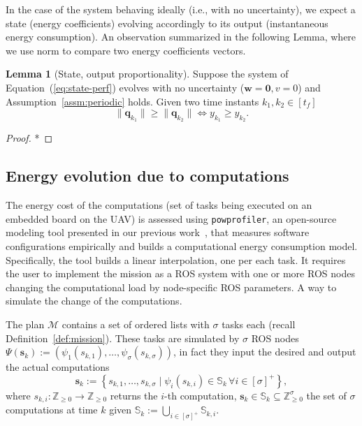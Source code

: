 \documentclass[letterpaper,10pt,conference]{ieeeconf}
\newcommand{\stt}[1]{{\small\tt #1}} %
\newcommand{\powprof}{\stt{powprofiler}}
\theoremstyle{definition}
\newtheorem{lem}[thm]{Lemma}
\begin{document}
In the case of the system behaving ideally (i.e., with no uncertainty), we expect a state (energy coefficients) evolving accordingly to its output (instantaneous energy consumption). An observation summarized in the following Lemma, where we use norm to compare two energy coefficients vectors.

\begin{lem}[State, output proportionality]\label{lem:state-vs-energy}
  Suppose the system of Equation~(\ref{eq:state-perf}) evolves with no uncertainty ($\mathbf{w}=\mathbf{0},v=0$) and Assumption~\ref{assm:periodic} holds. Given two time instants $k_1,k_2\in[t_f]$
  \begin{equation}
    \|\mathbf{q}_{k_1}\|\geq\|\mathbf{q}_{k_2}\|\iff y_{k_1}\geq y_{k_2}.
  \end{equation}
\end{lem}
\begin{proof}
  *
\end{proof}

\subsection{Energy evolution due to computations}
\label{sec:computations-model}

The energy cost of the computations (set of tasks being executed on an embedded board on the UAV) is assessed using \powprof{}, an open-source modeling tool presented in our previous work~\cite{seewald2019coarse}, that measures software configurations empirically and builds a computational energy consumption model. Specifically, the tool builds a linear interpolation, one per each task. It requires the user to implement the mission as a ROS system with one or more ROS nodes changing the computational load by node-specific ROS parameters. A way to simulate the change of the computations.

The plan $\mathcal{M}$ contains a set of ordered lists with $\sigma$ tasks each (recall Definition~\ref{def:mission}). These tasks are simulated by $\sigma$ ROS nodes $\Psi(\mathbf{s}_k):=\left(\psi_1(s_{k,1}),\dots,\psi_\sigma(s_{k,\sigma})\right)$, in fact they input the desired and output the actual computations
\begin{equation}\label{eq:qos-def}
  \mathbf{s}_k:=\left\{s_{k,1},\dots ,s_{k,\sigma}\mid \psi_i(s_{k,i})\in\mathbb{S}_{k}\,\forall i\in[\sigma]^+\right\},
\end{equation}
where $s_{k,i}:\mathbb{Z}_{\geq 0}\rightarrow\mathbb{Z}_{\geq 0}$ returns the $i$-th computation, $\mathbf{s}_k\in\mathbb{S}_k\subseteq\mathbb{Z}_{\geq 0}^\sigma$ the set of $\sigma$ computations at time $k$ given $\mathbb{S}_k:=\bigcup_{i\in[\sigma]^+}{\mathbb{S}_{k,i}}$.
\end{document}
